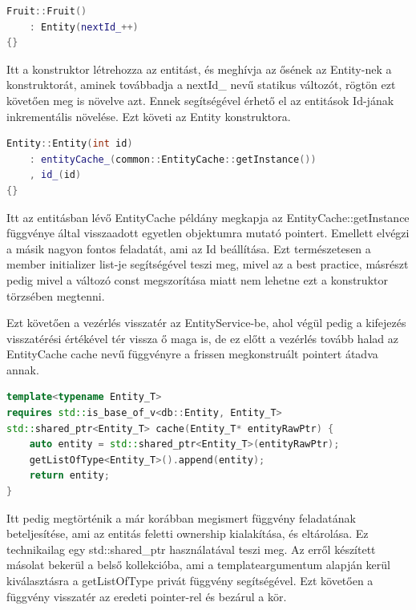 \begin{lstlisting}[language={C++}]
Fruit::Fruit()
    : Entity(nextId_++)
{}
\end{lstlisting}

Itt a konstruktor létrehozza az entitást, és meghívja az ősének az Entity-nek a konstruktorát, aminek továbbadja a nextId\_ nevű statikus változót, rögtön ezt követően meg is növelve azt. Ennek segítségével érhető el az entitások Id-jának inkrementális növelése. Ezt követi az Entity konstruktora.

\begin{lstlisting}[language={C++}]
Entity::Entity(int id)
    : entityCache_(common::EntityCache::getInstance())
    , id_(id)
{}
\end{lstlisting}

Itt az entitásban lévő EntityCache példány megkapja az EntityCache::getInstance függvénye által visszaadott egyetlen objektumra mutató pointert. Emellett elvégzi a másik nagyon fontos feladatát, ami az Id beállítása. Ezt természetesen a member initializer list-je segítségével teszi meg, mivel az a best practice, másrészt pedig mivel a változó const megszorítása miatt nem lehetne ezt a konstruktor törzsében megtenni.

Ezt követően a vezérlés visszatér az EntityService-be, ahol végül pedig a kifejezés visszatérési értékével tér vissza ő maga is, de ez előtt a vezérlés tovább halad az EntityCache cache nevű függvényre a frissen megkonstruált pointert átadva annak.

\begin{lstlisting}[language={C++}]
template<typename Entity_T>
requires std::is_base_of_v<db::Entity, Entity_T>
std::shared_ptr<Entity_T> cache(Entity_T* entityRawPtr) {
    auto entity = std::shared_ptr<Entity_T>(entityRawPtr);
    getListOfType<Entity_T>().append(entity);
    return entity;
}
\end{lstlisting}

Itt pedig megtörténik a már korábban megismert függvény feladatának beteljesítése, ami az entitás feletti ownership kialakítása, és eltárolása. Ez technikailag egy std::shared\_ptr használatával teszi meg. Az erről készített másolat bekerül a belső kollekcióba, ami a templateargumentum alapján kerül kiválasztásra a getListOfType privát függvény segítségével. Ezt követően a függvény visszatér az eredeti pointer-rel és bezárul a kör.

